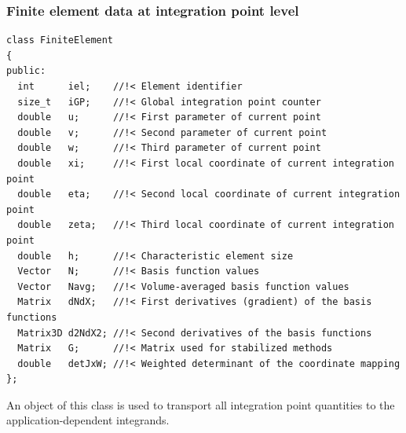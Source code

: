 \documentclass{beamer}
\begin{document}
\begin{frame}[fragile] %

 \frametitle{Finite element data at integration point level}

 \scriptsize
 \begin{verbatim}
class FiniteElement
{
public:
  int      iel;    //!< Element identifier
  size_t   iGP;    //!< Global integration point counter
  double   u;      //!< First parameter of current point
  double   v;      //!< Second parameter of current point
  double   w;      //!< Third parameter of current point
  double   xi;     //!< First local coordinate of current integration point
  double   eta;    //!< Second local coordinate of current integration point
  double   zeta;   //!< Third local coordinate of current integration point
  double   h;      //!< Characteristic element size
  Vector   N;      //!< Basis function values
  Vector   Navg;   //!< Volume-averaged basis function values
  Matrix   dNdX;   //!< First derivatives (gradient) of the basis functions
  Matrix3D d2NdX2; //!< Second derivatives of the basis functions
  Matrix   G;      //!< Matrix used for stabilized methods
  double   detJxW; //!< Weighted determinant of the coordinate mapping
};
 \end{verbatim}

 An object of this class is used to transport all integration point quantities
 to the application-dependent integrands.
\end{frame}
\end{document}
